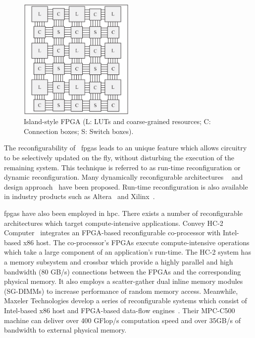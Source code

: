 \begin{figure}[ht]
\begin{center}
\includegraphics[width=0.5\textwidth]{2_background/figures/islandstyle}
\end{center}
\caption{Island-style FPGA (L: LUTs and coarse-grained resources; C: Connection boxes; S: Switch boxes).}
\label{fig:bg_islandstyle}
\end{figure}

The reconfigurability of ~\glspl{fpga} leads to an unique feature which allows circuitry to be selectively updated on the fly, without disturbing the execution of the remaining system.
This technique is referred to as run-time reconfiguration or dynamic reconfiguration.
Many dynamically reconfigurable architectures ~\cite{hauser97,trimberger97,ye00,fujii99} and design approach~\cite{li02,shenoy01,jeong00,li00,noguera01} have been proposed.
Run-time reconfiguration is also available in industry products such as Altera~\cite{alteradpr} and Xilinx~\cite{xilinxdpr}. 

\glspl{fpga} have also been employed in \gls{hpc}.
There exists a number of reconfigurable architectures which target compute-intensive applications.
Convey HC-2 Computer~\cite{conveyhc2} integrates an FPGA-based reconfigurable co-processor with Intel-based x86 host.
The co-processor's FPGAs execute compute-intensive operations which take a large component of an application's run-time.
The HC-2 system has a memory subsystem and crossbar which provide a highly parallel and high bandwidth (80 GB/s) connections between the FPGAs and the corresponding physical memory.
It also employs a scatter-gather dual inline memory modules (SG-DIMMs) to increase performance of random memory access.
Meanwhile, Maxeler Technologies develop a series of reconfigurable systems which consist of Intel-based x86 host and FPGA-based data-flow engines~\cite{maxeler}.
Their MPC-C500 machine can deliver over 400 GFlop/s computation speed and over 35GB/s of bandwidth to external physical memory.


